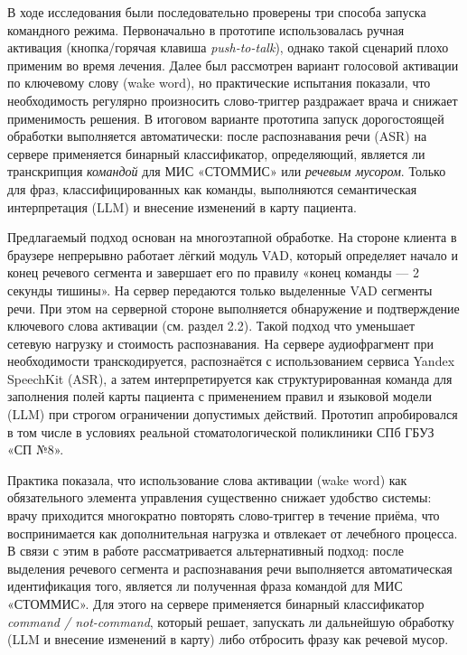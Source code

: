 В ходе исследования были последовательно проверены три способа запуска командного режима.
Первоначально в прототипе использовалась ручная активация (кнопка/горячая клавиша \textit{push-to-talk}), однако такой сценарий плохо применим во время лечения.
Далее был рассмотрен вариант голосовой активации по ключевому слову (wake word), но практические испытания показали, что необходимость регулярно произносить слово-триггер раздражает врача и снижает применимость решения.
В итоговом варианте прототипа запуск дорогостоящей обработки выполняется автоматически: после распознавания речи (ASR) на сервере применяется бинарный классификатор, определяющий, является ли транскрипция \emph{командой} для МИС «СТОММИС» или \emph{речевым мусором}.
Только для фраз, классифицированных как команды, выполняются семантическая интерпретация (LLM) и внесение изменений в карту пациента.

Предлагаемый подход основан на многоэтапной обработке.
На стороне клиента в браузере непрерывно работает лёгкий модуль VAD, который определяет начало и конец речевого сегмента и завершает его по правилу «конец команды — 2 секунды тишины».
На сервер передаются только выделенные VAD сегменты речи. При этом на серверной стороне выполняется обнаружение и подтверждение ключевого слова активации (см. раздел 2.2). Такой подход что уменьшает сетевую нагрузку и стоимость распознавания.
На сервере аудиофрагмент при необходимости транскодируется, распознаётся с использованием сервиса Yandex SpeechKit (ASR), а затем интерпретируется как структурированная команда для заполнения полей карты пациента с применением правил и языковой модели (LLM) при строгом ограничении допустимых действий.
Прототип апробировался в том числе в условиях реальной стоматологической поликлиники СПб ГБУЗ «СП №8».

Практика показала, что использование слова активации (wake word) как обязательного элемента управления
существенно снижает удобство системы: врачу приходится многократно повторять слово-триггер в течение приёма,
что воспринимается как дополнительная нагрузка и отвлекает от лечебного процесса.
В связи с этим в работе рассматривается альтернативный подход: после выделения речевого сегмента и распознавания речи
выполняется автоматическая идентификация того, является ли полученная фраза командой для МИС «СТОММИС».
Для этого на сервере применяется бинарный классификатор \textit{command / not-command},
который решает, запускать ли дальнейшую обработку (LLM и внесение изменений в карту) либо отбросить фразу как речевой мусор.
